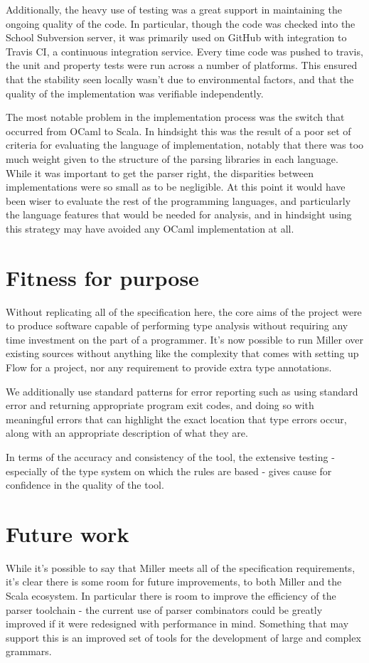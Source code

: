 \documentclass[british, twoside, openright]{bhamthesis}
\theoremstyle{definition}
\begin{document}
    Additionally, the heavy use of testing was a great support in maintaining the ongoing quality of the code. In particular, though the code was checked into the School Subversion server, it was primarily used on GitHub with integration to Travis CI, a continuous integration service. Every time code was pushed to travis, the unit and property tests were run across a number of platforms. This ensured that the stability seen locally wasn't due to environmental factors, and that the quality of the implementation was verifiable independently.

    The most notable problem in the implementation process was the switch that occurred from OCaml to Scala. In hindsight this was the result of a poor set of criteria for evaluating the language of implementation, notably that there was too much weight given to the structure of the parsing libraries in each language. While it was important to get the parser right, the disparities between implementations were so small as to be negligible. At this point it would have been wiser to evaluate the rest of the programming languages, and particularly the language features that would be needed for analysis, and in hindsight using this strategy may have avoided any OCaml implementation at all.

  \section{Fitness for purpose}
    Without replicating all of the specification here, the core aims of the project were to produce software capable of performing type analysis without requiring any time investment on the part of a programmer. It's now possible to run Miller over existing sources without anything like the complexity that comes with setting up Flow for a project, nor any requirement to provide extra type annotations.

    We additionally use standard patterns for error reporting such as using standard error and returning appropriate program exit codes, and doing so with meaningful errors that can highlight the exact location that type errors occur, along with an appropriate description of what they are.

    In terms of the accuracy and consistency of the tool, the extensive testing - especially of the type system on which the rules are based - gives cause for confidence in the quality of the tool.

  \section{Future work}
    While it's possible to say that Miller meets all of the specification requirements, it's clear there is some room for future improvements, to both Miller and the Scala ecosystem. In particular there is room to improve the efficiency of the parser toolchain - the current use of parser combinators could be greatly improved if it were redesigned with performance in mind. Something that may support this is an improved set of tools for the development of large and complex grammars.
\end{document}
